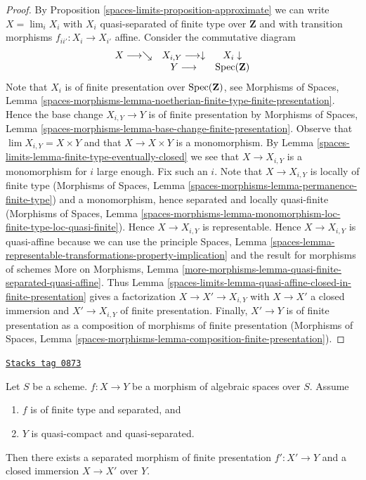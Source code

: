 \begin{proof}
By Proposition \ref{spaces-limits-proposition-approximate}
we can write $X = \lim_i X_i$ with $X_i$ quasi-separated of finite type over
$\mathbf{Z}$ and with transition morphisms $f_{ii'} : X_i \to X_{i'}$ affine.
Consider the commutative diagram
$$
\begin{array}{ccc}X \longrightarrow\searrow & X_{i, Y} \longrightarrow\downarrow & X_i \downarrow \\  & Y \longrightarrow & \operatorname{Spec}(\mathbf{Z})\end{array}
$$
Note that $X_i$ is of finite presentation over $\operatorname{Spec}(\mathbf{Z})$, see
Morphisms of Spaces, Lemma
\ref{spaces-morphisms-lemma-noetherian-finite-type-finite-presentation}.
Hence the base change $X_{i, Y} \to Y$ is of finite presentation by
Morphisms of Spaces, Lemma
\ref{spaces-morphisms-lemma-base-change-finite-presentation}.
Observe that $\lim X_{i, Y} = X \times Y$ and that $X \to X \times Y$ is a
monomorphism. By Lemma \ref{spaces-limits-lemma-finite-type-eventually-closed}
we see that $X \to X_{i, Y}$ is a monomorphism for $i$ large enough.
Fix such an $i$. Note that $X \to X_{i, Y}$ is locally of finite type
(Morphisms of Spaces, Lemma
\ref{spaces-morphisms-lemma-permanence-finite-type})
and a monomorphism, hence separated and locally quasi-finite
(Morphisms of Spaces, Lemma
\ref{spaces-morphisms-lemma-monomorphism-loc-finite-type-loc-quasi-finite}).
Hence $X \to X_{i, Y}$ is representable.
Hence $X \to X_{i, Y}$ is quasi-affine because we can use the
principle Spaces, Lemma
\ref{spaces-lemma-representable-transformations-property-implication}
and the result for morphisms of schemes More on Morphisms, Lemma
\ref{more-morphisms-lemma-quasi-finite-separated-quasi-affine}.
Thus Lemma \ref{spaces-limits-lemma-quasi-affine-closed-in-finite-presentation}
gives a factorization $X \to X' \to X_{i, Y}$
with $X \to X'$ a closed immersion and $X' \to X_{i, Y}$ of finite
presentation. Finally, $X' \to Y$ is of finite presentation as a
composition of morphisms of finite presentation
(Morphisms of Spaces, Lemma
\ref{spaces-morphisms-lemma-composition-finite-presentation}).
\end{proof}

\begin{proposition}
\label{spaces-limits-proposition-separated-closed-in-finite-presentation}
\href{https://stacks.math.columbia.edu/tag/0873}{\texttt{Stacks tag 0873}}

Let $S$ be a scheme. $f : X \to Y$ be a morphism of algebraic spaces
over $S$. Assume
\begin{enumerate}
\item $f$ is of finite type and separated, and
\item $Y$ is quasi-compact and quasi-separated.
\end{enumerate}
Then there exists a separated morphism of finite presentation
$f' : X' \to Y$ and a closed immersion $X \to X'$ over $Y$.
\end{proposition}


